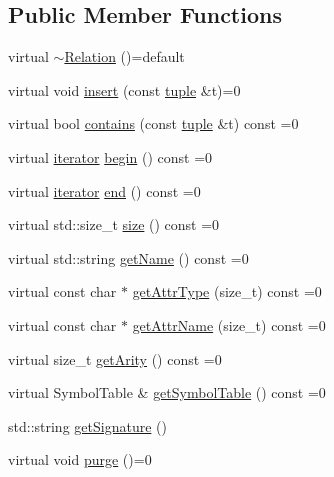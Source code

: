 \subsection*{Public Member Functions}
\begin{DoxyCompactItemize}
\item 
virtual \hyperlink{classsouffle_1_1_relation_aacc1e39d61e80905f92a20c6589776a4}{$\sim$\+Relation} ()=default
\item 
virtual void \hyperlink{classsouffle_1_1_relation_a4f118226c04197b2efa9901c91873b09}{insert} (const \hyperlink{classsouffle_1_1tuple}{tuple} \&t)=0
\item 
virtual bool \hyperlink{classsouffle_1_1_relation_a6f8ce381c8fc38ac6486015c961e3ef6}{contains} (const \hyperlink{classsouffle_1_1tuple}{tuple} \&t) const =0
\item 
virtual \hyperlink{classsouffle_1_1_relation_1_1iterator}{iterator} \hyperlink{classsouffle_1_1_relation_af6866f5c83061e31947ed2bd0f6d22e0}{begin} () const =0
\item 
virtual \hyperlink{classsouffle_1_1_relation_1_1iterator}{iterator} \hyperlink{classsouffle_1_1_relation_a48aa809188e822ba6a4c7309a9567fbd}{end} () const =0
\item 
virtual std\+::size\+\_\+t \hyperlink{classsouffle_1_1_relation_a7943e499688e4c73e293ed9db53bc329}{size} () const =0
\item 
virtual std\+::string \hyperlink{classsouffle_1_1_relation_a36b722447994202be331f76186abfa0a}{get\+Name} () const =0
\item 
virtual const char $\ast$ \hyperlink{classsouffle_1_1_relation_a2607e76650b5045cd84babfdd0bd64f3}{get\+Attr\+Type} (size\+\_\+t) const =0
\item 
virtual const char $\ast$ \hyperlink{classsouffle_1_1_relation_a25392b4674d7c7cbdc0de340b196e193}{get\+Attr\+Name} (size\+\_\+t) const =0
\item 
virtual size\+\_\+t \hyperlink{classsouffle_1_1_relation_a8e8e6b38e1d621e9cccd365eaedbd7e1}{get\+Arity} () const =0
\item 
virtual Symbol\+Table \& \hyperlink{classsouffle_1_1_relation_aafe66b5dd0bb775432f884bc47741a52}{get\+Symbol\+Table} () const =0
\item 
std\+::string \hyperlink{classsouffle_1_1_relation_aba2d25b446b972b4a607bb8d2ddc6dac}{get\+Signature} ()
\item 
virtual void \hyperlink{classsouffle_1_1_relation_a813a8dcd5e6b8c1415258e0059762fd3}{purge} ()=0
\end{DoxyCompactItemize}


